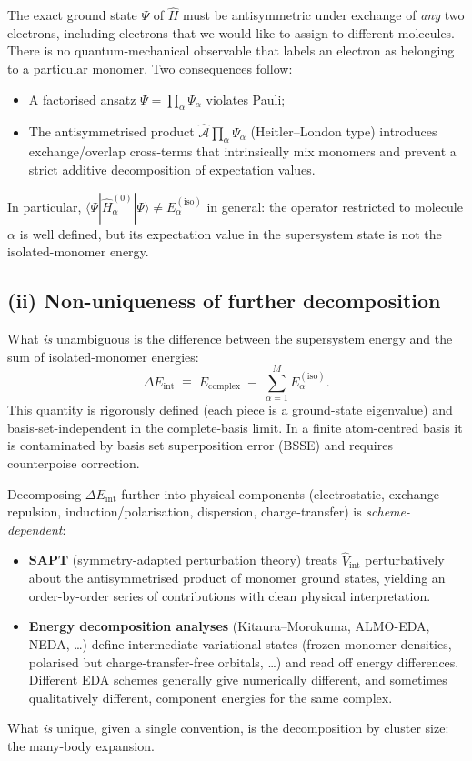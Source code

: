 \documentclass[11pt,a4paper]{article}
\newcommand{\Hop}{\hat{H}}
\newcommand{\Vop}{\hat{V}}
\newcommand{\Aop}{\hat{\mathcal{A}}}
\newcommand{\Eint}{\Delta E_{\mathrm{int}}}
\newcommand{\Eiso}{E^{(\mathrm{iso})}}
\newcommand{\Ecpl}{E_{\mathrm{complex}}}
\begin{document}
The exact ground state $\Psi$ of $\Hop$ must be antisymmetric under exchange of
\emph{any} two electrons, including electrons that we would like to assign to
different molecules. There is no quantum-mechanical observable that labels an
electron as belonging to a particular monomer. Two consequences follow:
\begin{itemize}[leftmargin=1.4em]
\item A factorised ansatz $\Psi = \prod_\alpha \Psi_\alpha$ violates Pauli;
\item The antisymmetrised product $\Aop \prod_\alpha \Psi_\alpha$ (Heitler--London
type) introduces exchange/overlap cross-terms that intrinsically mix monomers
and prevent a strict additive decomposition of expectation values.
\end{itemize}
In particular, $\langle \Psi | \Hop_\alpha^{(0)} | \Psi \rangle \neq \Eiso_\alpha$
in general: the operator restricted to molecule $\alpha$ is well defined, but
its expectation value in the supersystem state is not the isolated-monomer
energy.

\subsection*{(ii) Non-uniqueness of further decomposition}

What \emph{is} unambiguous is the difference between the supersystem energy and
the sum of isolated-monomer energies:
\begin{equation}
\Eint \;\equiv\; \Ecpl \;-\; \sum_{\alpha=1}^{M} \Eiso_\alpha.
\label{eq:Eint}
\end{equation}
This quantity is rigorously defined (each piece is a ground-state eigenvalue)
and basis-set-independent in the complete-basis limit. In a finite atom-centred
basis it is contaminated by basis set superposition error (BSSE) and requires
counterpoise correction.

Decomposing $\Eint$ further into physical components
(electrostatic, exchange-repulsion, induction/polarisation, dispersion,
charge-transfer) is \emph{scheme-dependent}:
\begin{itemize}[leftmargin=1.4em]
\item \textbf{SAPT} (symmetry-adapted perturbation theory) treats
$\Vop_{\mathrm{int}}$ perturbatively about the antisymmetrised product of
monomer ground states, yielding an order-by-order series of contributions with
clean physical interpretation.
\item \textbf{Energy decomposition analyses} (Kitaura--Morokuma, ALMO-EDA,
NEDA, \ldots) define intermediate variational states (frozen monomer densities,
polarised but charge-transfer-free orbitals, \ldots) and read off energy
differences. Different EDA schemes generally give numerically different, and
sometimes qualitatively different, component energies for the same complex.
\end{itemize}
What \emph{is} unique, given a single convention, is the decomposition by
cluster size: the many-body expansion.
\end{document}

